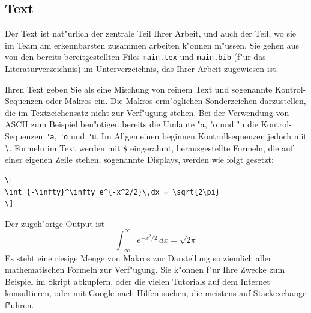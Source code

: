 \documentclass[a4paper,12pt]{article}
\begin{document}
\subsection{Text}
Der Text ist nat"urlich der zentrale Teil Ihrer Arbeit, und auch der
Teil, wo sie im Team am erkennbarsten zusammen arbeiten k"onnen m"ussen.
Sie gehen aus von den bereits bereitgestellten Files \verb+main.tex+
und \verb+main.bib+ (f"ur das Literaturverzeichnis) im Unterverzeichnis,
das Ihrer Arbeit zugewiesen ist.

Ihren Text geben Sie als eine Mischung von reinem Text und sogenannte
Kontrol-Sequenzen oder Makros ein.
Die Makros erm"oglichen Sonderzeichen darzustellen, die im Textzeichensatz
nicht zur Verf"ugung stehen.
Bei der Verwendung von ASCII zum Beispiel ben"otigen bereits die Umlaute
"a, "o und "u
die Kontrol-Sequenzen 
\verb+"a+,
\verb+"o+ und
\verb+"u+.
Im Allgemeinen beginnen Kontrollsequenzen jedoch mit $\tt{\backslash}$.
Formeln im Text werden mit \verb+$+ eingerahmt, herausgestellte Formeln,
die auf einer eigenen Zeile stehen, sogenannte Displays, werden wie folgt
gesetzt:
\begin{verbatim}
\[
\int_{-\infty}^\infty e^{-x^2/2}\,dx = \sqrt{2\pi}
\]
\end{verbatim}
Der zugeh"orige Output ist
\[
\int_{-\infty}^\infty e^{-x^2/2}\,dx = \sqrt{2\pi}
\]
Es steht eine riesige Menge von Makros zur Darstellung so ziemlich
aller mathematischen Formeln zur Verf"ugung.
Sie k"onnen f"ur Ihre Zwecke zum Beispiel im Skript abkupfern, oder
die vielen Tutorials auf dem Internet konsultieren, oder mit Google
nach Hilfen suchen, die meistens auf Stackexchange f"uhren.
\end{document}

